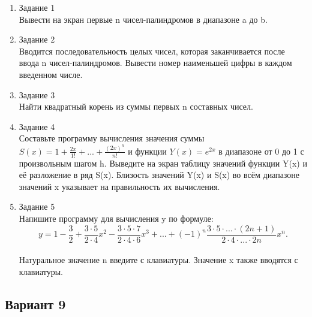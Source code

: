\documentclass[a4paper]{article}
\begin{document}
	\begin{enumerate} 
		\item Задание 1 \\
			Вывести на экран первые n чисел-палиндромов в диапазоне a до b.\\
		\item Задание 2\\
			Вводится последовательность целых чисел, которая заканчивается после ввода n чисел-палиндромов. 
			Вывести номер наименьшей цифры в каждом введенном числе.\\
		\item Задание 3 \\
			Найти квадратный корень из суммы первых n составных чисел.\\
		\item Задание 4 \\ 
			Составьте программу вычисления значения суммы  $S(x)=1+\frac{2x}{1!}+...+\frac{(2x)^n}{n!}$
			и функции $Y(x)=e^{2x}$ в диапазоне от 0 до 1
			с произвольным шагом h. Выведите на экран таблицу значений функции Y(x) и её разложение в ряд S(x). Близость значений Y(x) и S(x) во всём диапазоне
			значений x указывает на правильность их вычисления.\\
		\item Задание 5 \\
			Напишите программу для вычисления y по формуле:\\
			$$y=1-\frac{3}{2}+\frac{3\cdot5}{2\cdot4}x^2-\frac{3\cdot5\cdot7}{2\cdot4\cdot6}x^3+...+(-1)^n\frac{3\cdot5\cdot...\cdot(2n+1)}{2\cdot4\cdot...\cdot2n}x^n.$$\\
			Натуральное значение n введите с клавиатуры. Значение x также вводятся с клавиатуры.\\
	\end{enumerate}
	
	
	\begin{center}
		\subsection*{Вариант 9}
	\end{center}
	
\end{document}

